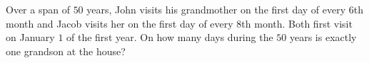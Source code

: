 Over a span of $50$ years, John visits his grandmother on the first day of every $6$th month and Jacob visits her on the first day of every $8$th month. Both first visit on January $1$ of the first year. On how many days during the $50$ years is exactly one grandson at the house?
